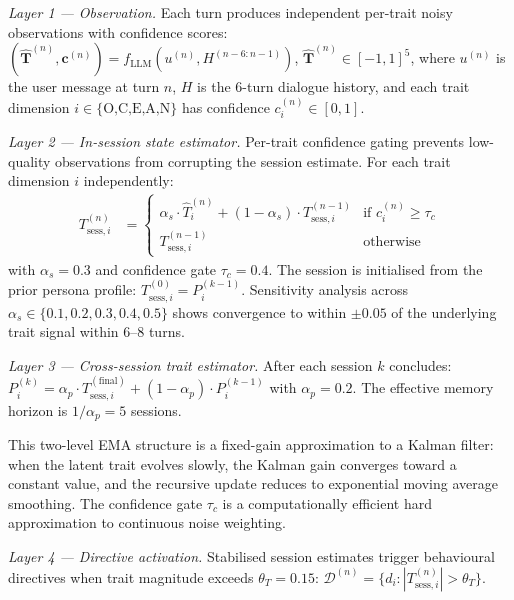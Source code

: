 \documentclass[10pt,a4paper]{report}
\begin{document}
\emph{Layer 1 --- Observation.} Each turn produces independent per-trait noisy observations with confidence scores: $(\hat{\mathbf{T}}^{(n)}, \mathbf{c}^{(n)}) = f_{\text{LLM}}(u^{(n)}, H^{(n-6:n-1)})$, $\hat{\mathbf{T}}^{(n)} \in [-1,1]^5$, where $u^{(n)}$ is the user message at turn $n$, $H$ is the 6-turn dialogue history, and each trait dimension $i \in \{\text{O,C,E,A,N}\}$ has confidence $c_i^{(n)} \in [0,1]$.

\emph{Layer 2 --- In-session state estimator.} Per-trait confidence gating prevents low-quality observations from corrupting the session estimate. For each trait dimension $i$ independently:
\begin{align}
T_{\text{sess},i}^{(n)} &= \begin{cases}
\alpha_s \cdot \hat{T}_i^{(n)} + (1-\alpha_s)\cdot T_{\text{sess},i}^{(n-1)} & \text{if } c_i^{(n)} \geq \tau_c \\
T_{\text{sess},i}^{(n-1)} & \text{otherwise}
\end{cases}
\end{align}
with $\alpha_s = 0.3$ and confidence gate $\tau_c = 0.4$. The session is initialised from the prior persona profile: $T_{\text{sess},i}^{(0)} = P_i^{(k-1)}$. Sensitivity analysis across $\alpha_s \in \{0.1, 0.2, 0.3, 0.4, 0.5\}$ shows convergence to within $\pm 0.05$ of the underlying trait signal within 6--8 turns.

\emph{Layer 3 --- Cross-session trait estimator.} After each session $k$ concludes: $P_i^{(k)} = \alpha_p \cdot T_{\text{sess},i}^{(\text{final})} + (1-\alpha_p)\cdot P_i^{(k-1)}$ with $\alpha_p = 0.2$. The effective memory horizon is $1/\alpha_p = 5$ sessions.

This two-level EMA structure is a fixed-gain approximation to a Kalman filter: when the latent trait evolves slowly, the Kalman gain converges toward a constant value, and the recursive update reduces to exponential moving average smoothing. The confidence gate $\tau_c$ is a computationally efficient hard approximation to continuous noise weighting.

\emph{Layer 4 --- Directive activation.} Stabilised session estimates trigger behavioural directives when trait magnitude exceeds $\theta_T = 0.15$: $\mathcal{D}^{(n)} = \{ d_i : |T_{\text{sess},i}^{(n)}| > \theta_T \}$.
\end{document}

